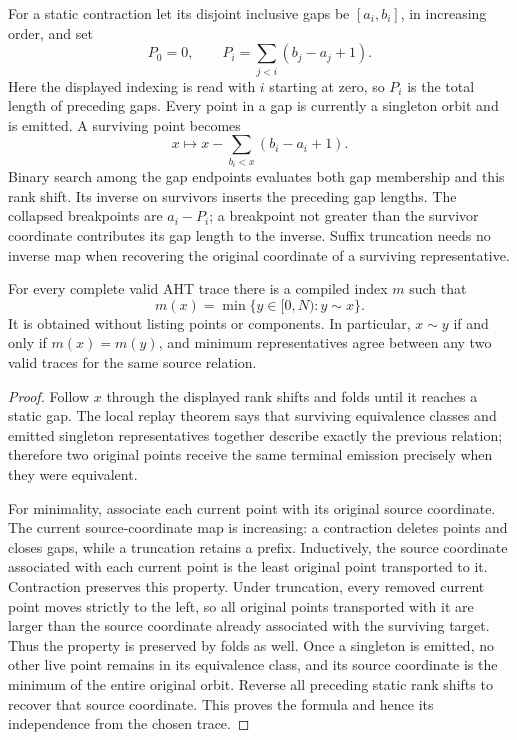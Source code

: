 For a static contraction let its disjoint inclusive gaps be
$[a_i,b_i]$, in increasing order, and set
\[
 P_0=0,\qquad P_i=\sum_{j<i}(b_j-a_j+1).
\]
Here the displayed indexing is read with $i$ starting at zero, so $P_i$ is
the total length of preceding gaps.  Every point in a gap is currently a
singleton orbit and is emitted.  A surviving point becomes
\[
 x\longmapsto x-\sum_{b_i<x}(b_i-a_i+1).
\]
Binary search among the gap endpoints evaluates both gap membership and
this rank shift.  Its inverse on survivors inserts the preceding gap
lengths.  The collapsed breakpoints are $a_i-P_i$; a breakpoint not greater
than the survivor coordinate contributes its gap length to the inverse.
Suffix truncation needs no inverse map when recovering the original
coordinate of a surviving representative.

\begin{theorem}
For every complete valid AHT trace there is a compiled index $m$ such that
\[
 m(x)=\min\{y\in[0,N):y\sim x\}.
\]
It is obtained without listing points or components.  In particular,
$x\sim y$ if and only if $m(x)=m(y)$, and minimum representatives agree
between any two valid traces for the same source relation.
\end{theorem}
\begin{proof}
Follow $x$ through the displayed rank shifts and folds until it reaches
a static gap.  The local replay theorem says that surviving equivalence
classes and emitted singleton representatives together describe exactly
the previous relation; therefore two original points receive the same
terminal emission precisely when they were equivalent.

For minimality, associate each current point with its original source
coordinate.  The current source-coordinate map is increasing: a contraction
deletes points and closes gaps, while a truncation retains a prefix.
Inductively, the source coordinate associated with each current point is
the least original point transported to it.  Contraction preserves this
property.  Under truncation, every removed current point moves strictly to
the left, so all original points transported with it are larger than the
source coordinate already associated with the surviving target.  Thus the
property is preserved by folds as well.  Once a singleton is emitted, no
other live point remains in its equivalence class, and its source coordinate
is the minimum of the entire original orbit.  Reverse all preceding static
rank shifts to recover that source coordinate.  This proves the formula
and hence its independence from the chosen trace.
\end{proof}

